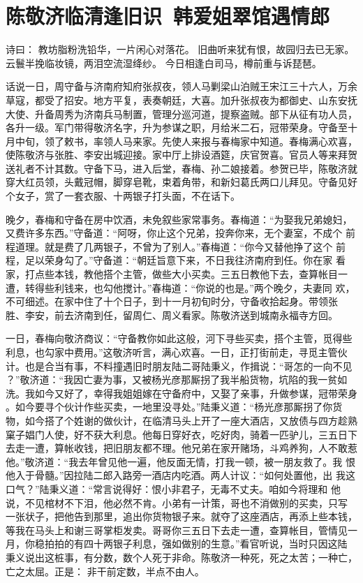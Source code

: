 \chapter{陈敬济临清逢旧识~韩爱姐翠馆遇情郎}

诗曰：
教坊脂粉洗铅华，一片闲心对落花。
旧曲听来犹有恨，故园归去已无家。
云鬟半挽临妆镜，两泪空流湿绛纱。
今日相逢白司马，樽前重与诉琵琶。

话说一日，周守备与济南府知府张叔夜，领人马剿梁山泊贼王宋江三十六人，万余
草寇，都受了招安。地方平复，表奏朝廷，大喜。加升张叔夜为都御史、山东安抚
大使、升备周秀为济南兵马制置，管理分巡河道，提察盗贼。部下从征有功人员，
各升一级。军门带得敬济名字，升为参谋之职，月给米二石，冠带荣身。守备至十
月中旬，领了敕书，率领人马来家。先使人来报与春梅家中知道。春梅满心欢喜，
使陈敬济与张胜、李安出城迎接。家中厅上排设酒筵，庆官贺喜。官员人等来拜贺
送礼者不计其数。守备下马，进入后堂，春梅、孙二娘接着。参贺已毕，陈敬济就
穿大红员领，头戴冠帽，脚穿皂靴，束着角带，和新妇葛氏两口儿拜见。守备见好
个女子，赏了一套衣服、十两银子打头面，不在话下。

晚夕，春梅和守备在房中饮酒，未免叙些家常事务。春梅道：“为娶我兄弟媳妇，
又费许多东西。”守备道：“阿呀，你止这个兄弟，投奔你来，无个妻室，不成个
前程道理。就是费了几两银子，不曾为了别人。”春梅道：“你今又替他挣了这个
前程，足以荣身勾了。”守备道：“朝廷旨意下来，不日我往济南府到任。你在家
看家，打点些本钱，教他搭个主管，做些大小买卖。三五日教他下去，查算帐目一
遭，转得些利钱来，也勾他搅计。”春梅道：“你说的也是。”两个晚夕，夫妻同
欢，不可细述。在家中住了十个日子，到十一月初旬时分，守备收拾起身。带领张
胜、李安，前去济南到任，留周仁、周义看家。陈敬济送到城南永福寺方回。

一日，春梅向敬济商议：“守备教你如此这般，河下寻些买卖，搭个主管，觅得些
利息，也勾家中费用。”这敬济听言，满心欢喜。一日，正打街前走，寻觅主管伙
计。也是合当有事，不料撞遇旧时朋友陆二哥陆秉义，作揖说：“哥怎的一向不见
？”敬济道：“我因亡妻为事，又被杨光彦那厮拐了我半船货物，坑陷的我一贫如
洗。我如今又好了，幸得我姐姐嫁在守备府中，又娶了亲事，升做参谋，冠带荣身
。如今要寻个伙计作些买卖，一地里没寻处。”陆秉义道：“杨光彦那厮拐了你货
物，如今搭了个姓谢的做伙计，在临清马头上开了一座大酒店，又放债与四方趁熟
窠子娼门人使，好不获大利息。他每日穿好衣，吃好肉，骑着一匹驴儿，三五日下
去走一遭，算帐收钱，把旧朋友都不理。他兄弟在家开赌场，斗鸡养狗，人不敢惹
他。”敬济道：“我去年曾见他一遍，他反面无情，打我一顿，被一朋友救了。我
恨他入于骨髓。”因拉陆二郎入路旁一酒店内吃酒。两人计议：“如何处置他，出
我这口气？”陆秉义道：“常言说得好：恨小非君子，无毒不丈夫。咱如今将理和
他说，不见棺材不下泪，他必然不肯。小弟有一计策，哥也不消做别的买卖，只写
一张状子，把他告到那里，追出你货物银子来。就夺了这座酒店，再添上些本钱，
等我在马头上和谢三哥掌柜发卖。哥哥你三五日下去走一遭，查算帐目，管情见一
月，你稳拍拍的有四十两银子利息，强如做别的生意。”看官听说，当时只因这陆
秉义说出这桩事，有分数，数个人死于非命。陈敬济一种死，死之太苦；一种亡，
亡之太屈。正是：
非干前定数，半点不由人。

